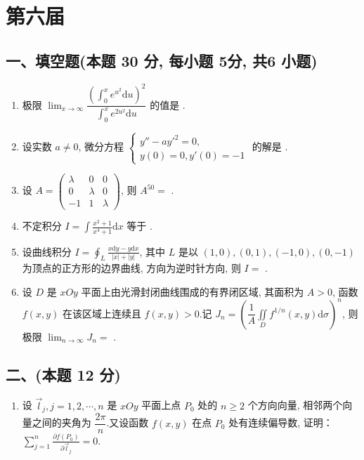 \newpage
\section{第六届}

\subsection*{一、填空题(本题 30 分,  每小题 5分,  共6 小题)}
\begin{enumerate}
    \item 极限 $\displaystyle\lim_{x\rightarrow\infty}\dfrac{\left(\displaystyle\int_0^x e^{u^2}\mathrm{d}u\right)^2}{\displaystyle\int_0^x e^{2u^2}\mathrm{d}u}$ 的值是 \underline{\quad \quad}.
    \item 设实数 $a \neq 0$, 微分方程
          $\begin{cases}
                  y'' - a y'^2 = 0 , \\
                  y(0) = 0, y'(0) = -1
              \end{cases} $
          的解是 \underline{\quad \quad}.
    \item 设 $A = \begin{pmatrix}
                  \lambda & 0       & 0       \\
                  0       & \lambda & 0       \\
                  -1      & 1       & \lambda
              \end{pmatrix}$, 则 $A^{50} =$ \underline{\quad \quad}.
    \item 不定积分 $I = \displaystyle\int \frac{x^2 + 1}{x^4 + 1}\mathrm{d}x$ 等于 \underline{\quad \quad}.
    \item 设曲线积分 $I = \displaystyle\oint_L \frac{x\mathrm{d}y - y\mathrm{d}x}{|x| + |y|}$, 其中 $L$ 是以 $(1,0), (0,1), (-1,0), (0,-1)$ 为顶点的正方形的边界曲线, 方向为逆时针方向, 则 $I =$ \underline{\quad \quad}.
    \item 设 $D$ 是 $xOy$ 平面上由光滑封闭曲线围成的有界闭区域, 其面积为 $A > 0$, 函数 $f(x,y)$ 在该区域上连续且 $f(x,y) > 0$.记 $J_n = \left(\dfrac{1}{A}\displaystyle\iint\limits_D f^{1/n}(x,y)\mathrm{d}\sigma\right)^n$, 则极限 $\displaystyle\lim_{n\rightarrow\infty} J_n =$ \underline{\quad \quad}.
\end{enumerate}

\subsection*{二、(本题 12 分)}
\begin{enumerate}[start=7]
    \item 设 $\vec{l}_j, j = 1, 2, \cdots, n$ 是 $xOy$ 平面上点 $P_0$ 处的 $n \geqslant 2$ 个方向向量, 相邻两个向量之间的夹角为 $\dfrac{2\pi}{n}$.又设函数 $f(x, y)$ 在点 $P_0$ 处有连续偏导数, 证明：
          $\displaystyle\sum_{j=1}^{n} \frac{\partial f(P_0)}{\partial \vec{l}_j} = 0.$
\end{enumerate}

